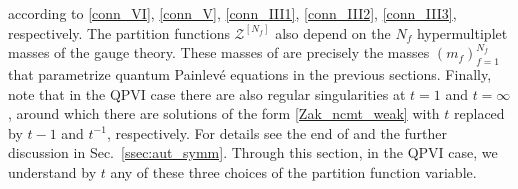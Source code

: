 \documentclass[12pt,a4paper]{article}
\numberwithin{equation}{section}
\begin{document}
according to \eqref{conn_VI}, \eqref{conn_V}, \eqref{conn_III1}, \eqref{conn_III2}, \eqref{conn_III3}, respectively. The partition functions $\mathcal{Z}^{[N_f]}$ also depend on the $N_f$ hypermultiplet masses of the gauge theory. These masses of \cite{BST25} are precisely the masses $(m_f)_{f=1}^{N_f}$ that parametrize quantum Painlev\'e equations in the previous sections. Finally, note that in the QPVI case there are also regular singularities at $t=1$ and $t=\infty$, around which there are  solutions of the form \eqref{Zak_ncmt_weak} with $t$ replaced by $t{-}1$ and $t^{-1}$, respectively. For details see the end of \cite[Sec. 2.3]{BST25} and the further discussion in Sec.~\ref{ssec:aut_symm}. Through this section, in the QPVI case, we understand by $t$ any of these three choices of the partition function variable.
\end{document}
